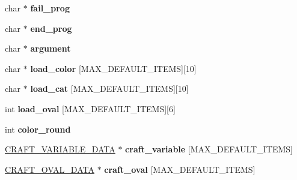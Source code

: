 \begin{DoxyCompactItemize}
\item 
\hypertarget{structsubcraft__head__data_a578d5c064bc0bb1f501ae156dc9767e3}{char $\ast$ {\bfseries fail\-\_\-prog}}\label{structsubcraft__head__data_a578d5c064bc0bb1f501ae156dc9767e3}

\item 
\hypertarget{structsubcraft__head__data_a7ecbf10c363f429751ca5093404658f8}{char $\ast$ {\bfseries end\-\_\-prog}}\label{structsubcraft__head__data_a7ecbf10c363f429751ca5093404658f8}

\item 
\hypertarget{structsubcraft__head__data_a00d84b6f7e39a3156409eb3a59e6d807}{char $\ast$ {\bfseries argument}}\label{structsubcraft__head__data_a00d84b6f7e39a3156409eb3a59e6d807}

\item 
\hypertarget{structsubcraft__head__data_afb8ed0037e47e541e07a7f6acb5f99ca}{char $\ast$ {\bfseries load\-\_\-color} \mbox{[}M\-A\-X\-\_\-\-D\-E\-F\-A\-U\-L\-T\-\_\-\-I\-T\-E\-M\-S\mbox{]}\mbox{[}10\mbox{]}}\label{structsubcraft__head__data_afb8ed0037e47e541e07a7f6acb5f99ca}

\item 
\hypertarget{structsubcraft__head__data_aedee02b8935b1a39183128ac9f7bca55}{char $\ast$ {\bfseries load\-\_\-cat} \mbox{[}M\-A\-X\-\_\-\-D\-E\-F\-A\-U\-L\-T\-\_\-\-I\-T\-E\-M\-S\mbox{]}\mbox{[}10\mbox{]}}\label{structsubcraft__head__data_aedee02b8935b1a39183128ac9f7bca55}

\item 
\hypertarget{structsubcraft__head__data_aa46e793e80691dbd4b14640169ce69a6}{int {\bfseries load\-\_\-oval} \mbox{[}M\-A\-X\-\_\-\-D\-E\-F\-A\-U\-L\-T\-\_\-\-I\-T\-E\-M\-S\mbox{]}\mbox{[}6\mbox{]}}\label{structsubcraft__head__data_aa46e793e80691dbd4b14640169ce69a6}

\item 
\hypertarget{structsubcraft__head__data_af3f3fe1b55266eb06d64c439280715eb}{int {\bfseries color\-\_\-round}}\label{structsubcraft__head__data_af3f3fe1b55266eb06d64c439280715eb}

\item 
\hypertarget{structsubcraft__head__data_a12581b1763e53f631a8950196c6c4b37}{\hyperlink{structcraft__variable__data}{C\-R\-A\-F\-T\-\_\-\-V\-A\-R\-I\-A\-B\-L\-E\-\_\-\-D\-A\-T\-A} $\ast$ {\bfseries craft\-\_\-variable} \mbox{[}M\-A\-X\-\_\-\-D\-E\-F\-A\-U\-L\-T\-\_\-\-I\-T\-E\-M\-S\mbox{]}}\label{structsubcraft__head__data_a12581b1763e53f631a8950196c6c4b37}

\item 
\hypertarget{structsubcraft__head__data_a68f92ad998edadb6606ea616f696e312}{\hyperlink{structcraft__oval__data}{C\-R\-A\-F\-T\-\_\-\-O\-V\-A\-L\-\_\-\-D\-A\-T\-A} $\ast$ {\bfseries craft\-\_\-oval} \mbox{[}M\-A\-X\-\_\-\-D\-E\-F\-A\-U\-L\-T\-\_\-\-I\-T\-E\-M\-S\mbox{]}}\label{structsubcraft__head__data_a68f92ad998edadb6606ea616f696e312}


\end{DoxyCompactItemize}
